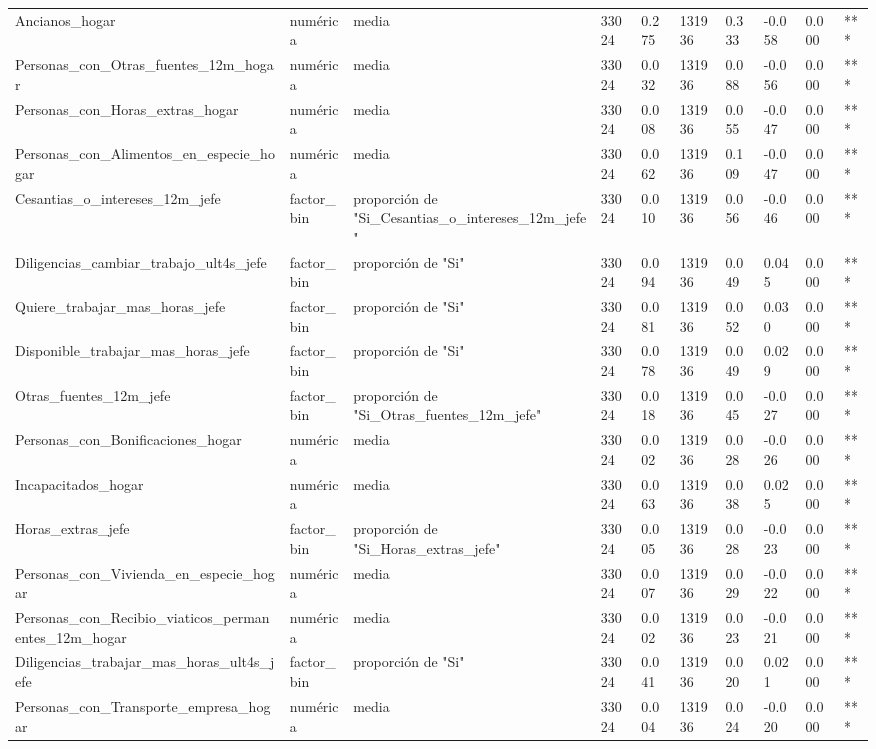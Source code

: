 \begin{longtable}[t]{llllllllll}
Ancianos\_hogar & numérica & media & 33024 & 0.275 & 131936 & 0.333 & -0.058 & 0.000 & ***\\
Personas\_con\_Otras\_fuentes\_12m\_hogar & numérica & media & 33024 & 0.032 & 131936 & 0.088 & -0.056 & 0.000 & ***\\
Personas\_con\_Horas\_extras\_hogar & numérica & media & 33024 & 0.008 & 131936 & 0.055 & -0.047 & 0.000 & ***\\
Personas\_con\_Alimentos\_en\_especie\_hogar & numérica & media & 33024 & 0.062 & 131936 & 0.109 & -0.047 & 0.000 & ***\\
Cesantias\_o\_intereses\_12m\_jefe & factor\_bin & proporción de "Si\_Cesantias\_o\_intereses\_12m\_jefe" & 33024 & 0.010 & 131936 & 0.056 & -0.046 & 0.000 & ***\\
Diligencias\_cambiar\_trabajo\_ult4s\_jefe & factor\_bin & proporción de "Si" & 33024 & 0.094 & 131936 & 0.049 & 0.045 & 0.000 & ***\\
Quiere\_trabajar\_mas\_horas\_jefe & factor\_bin & proporción de "Si" & 33024 & 0.081 & 131936 & 0.052 & 0.030 & 0.000 & ***\\
Disponible\_trabajar\_mas\_horas\_jefe & factor\_bin & proporción de "Si" & 33024 & 0.078 & 131936 & 0.049 & 0.029 & 0.000 & ***\\
Otras\_fuentes\_12m\_jefe & factor\_bin & proporción de "Si\_Otras\_fuentes\_12m\_jefe" & 33024 & 0.018 & 131936 & 0.045 & -0.027 & 0.000 & ***\\
Personas\_con\_Bonificaciones\_hogar & numérica & media & 33024 & 0.002 & 131936 & 0.028 & -0.026 & 0.000 & ***\\
Incapacitados\_hogar & numérica & media & 33024 & 0.063 & 131936 & 0.038 & 0.025 & 0.000 & ***\\
Horas\_extras\_jefe & factor\_bin & proporción de "Si\_Horas\_extras\_jefe" & 33024 & 0.005 & 131936 & 0.028 & -0.023 & 0.000 & ***\\
Personas\_con\_Vivienda\_en\_especie\_hogar & numérica & media & 33024 & 0.007 & 131936 & 0.029 & -0.022 & 0.000 & ***\\
Personas\_con\_Recibio\_viaticos\_permanentes\_12m\_hogar & numérica & media & 33024 & 0.002 & 131936 & 0.023 & -0.021 & 0.000 & ***\\
Diligencias\_trabajar\_mas\_horas\_ult4s\_jefe & factor\_bin & proporción de "Si" & 33024 & 0.041 & 131936 & 0.020 & 0.021 & 0.000 & ***\\
Personas\_con\_Transporte\_empresa\_hogar & numérica & media & 33024 & 0.004 & 131936 & 0.024 & -0.020 & 0.000 & ***\\

\end{longtable}
